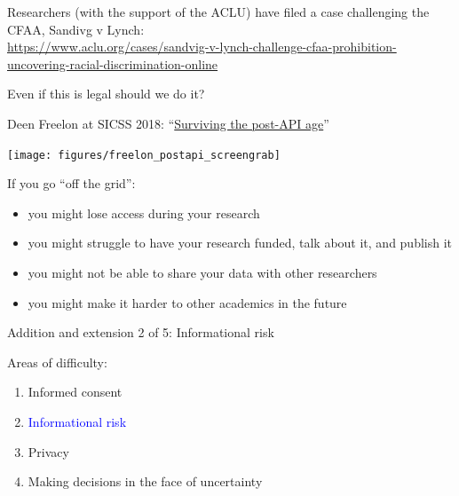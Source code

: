 \documentclass{beamer}
\begin{document}
\begin{frame}

Researchers (with the support of the ACLU) have filed a case challenging the CFAA, Sandivg v Lynch:\\
\tiny{\textcolor{blue}{\url{https://www.aclu.org/cases/sandvig-v-lynch-challenge-cfaa-prohibition-uncovering-racial-discrimination-online}}}

\end{frame}
\begin{frame}

Even if this is legal should we do it? \pause

Deen Freelon at SICSS 2018: ``\textcolor{blue}{\href{https://www.youtube.com/watch?v=GWpCHh54pXU}{Surviving the post-API age}}''

\begin{center}
\texttt{[image: figures/freelon\_postapi\_screengrab]}
\end{center}


If you go ``off the grid'': \pause
\begin{itemize}
\item you might lose access during your research
\pause
\item you might struggle to have your research funded, talk about it, and publish it
\pause
\item you might not be able to share your data with other researchers
\pause
\item you might make it harder to other academics in the future
\end{itemize}

\end{frame}
\begin{frame}

\begin{center}
Addition and extension 2 of 5: Informational risk
\end{center}

\end{frame}
\begin{frame}

Areas of difficulty:
\begin{enumerate}
\item Informed consent
\item \textcolor{blue}{Informational risk}
\item Privacy
\item Making decisions in the face of uncertainty
\end{enumerate}

\end{frame}
\end{document}
